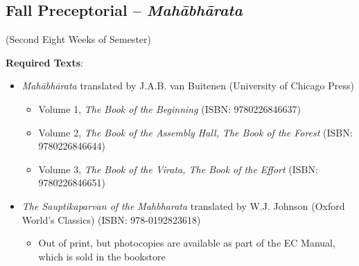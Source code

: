 \documentclass{article}
\newcounter{cntSemester} %
\begin{document}

\clearpage


\begin{center}
	\section{Fall Preceptorial -- \emph{Mahābhārata}}
	 (Second Eight Weeks of Semester)
\end{center}

\textbf{Required Texts}:
\newcommand{\fallPreceptTwoReadingList}{%
	\begin{itemize}
		\item \textit{Mahābhārata} translated by J.A.B. van Buitenen (University of Chicago Press)
		      \begin{itemize}
			      \item Volume 1, \textit{The Book of the Beginning} (ISBN: 9780226846637)
			      \item Volume 2, \textit{The Book of the Assembly Hall, The Book of the Forest} (ISBN: 9780226846644)
			      \item Volume 3, \textit{The Book of the Virata, The Book of the Effort} (ISBN: 9780226846651)
		      \end{itemize}
		\item \textit{The Sauptikaparvan of the Mahbharata} translated by W.J. Johnson (Oxford World’s Classics) (ISBN: 978-0192823618)
		      \begin{itemize}
			      \item Out of print, but photocopies are available as part of the EC Manual, which is sold in the bookstore
		      \end{itemize}
	\end{itemize}
}
\fallPreceptTwoReadingList
\end{document}
